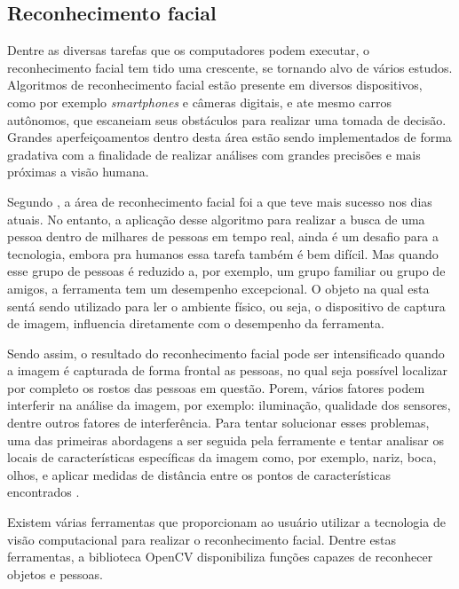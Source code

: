 \subsection{Reconhecimento facial}

Dentre as diversas tarefas que os computadores podem executar, o reconhecimento facial tem tido uma crescente, se tornando alvo de vários estudos. Algoritmos de reconhecimento facial estão presente em diversos dispositivos, como por exemplo \textit{smartphones} e câmeras digitais, e ate mesmo carros autônomos, que escaneiam seus obstáculos para realizar uma tomada de decisão. Grandes aperfeiçoamentos dentro desta área estão sendo implementados de forma gradativa com a finalidade de realizar análises com grandes precisões e mais próximas a visão humana.

Segundo , a área de reconhecimento facial foi a que teve mais sucesso nos dias atuais. No entanto, a aplicação desse algoritmo para realizar a busca de uma pessoa dentro de milhares de pessoas em tempo real, ainda é um desafio para a tecnologia, embora pra humanos essa tarefa também é bem difícil. Mas quando esse grupo de pessoas é reduzido a, por exemplo, um grupo familiar ou grupo de amigos, a ferramenta tem um desempenho excepcional. O objeto na qual esta sentá sendo utilizado para ler o ambiente físico, ou seja, o dispositivo de captura de imagem, influencia diretamente com o desempenho da ferramenta.

Sendo assim, o resultado do reconhecimento facial pode ser intensificado quando a imagem é capturada de forma frontal as pessoas, no qual seja possível localizar por completo os rostos das pessoas em questão. Porem, vários fatores podem interferir na análise da imagem, por exemplo: iluminação, qualidade dos sensores, dentre outros fatores de interferência. Para tentar solucionar esses problemas, uma das primeiras abordagens a ser seguida pela ferramente e tentar analisar os locais de características específicas da imagem como, por exemplo, nariz, boca, olhos, e aplicar medidas de distância entre os pontos de características encontrados \cite{SZELISKI2010}.

Existem várias ferramentas que proporcionam ao usuário utilizar a tecnologia de visão computacional para realizar o reconhecimento facial. Dentre estas ferramentas, a biblioteca OpenCV disponibiliza funções capazes de reconhecer objetos e pessoas. 